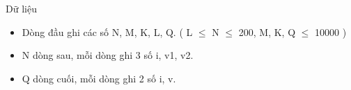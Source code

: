 Dữ liệu
\begin{itemize}
	\item        Dòng đầu ghi    các số N, M, K, L, Q. ( L  $\le$  N  $\le$  200, M, K, Q  $\le$  10000    )      
	\item        N dòng sau, mỗi    dòng ghi 3 số i, v1, v2.      
	\item        Q dòng cuối,    mỗi dòng ghi 2 số i, v.      
\end{itemize}